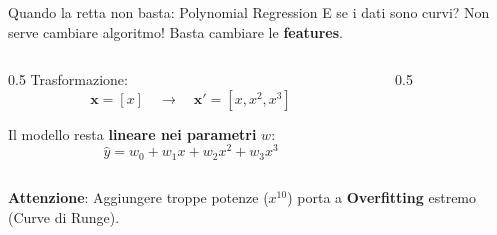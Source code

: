 \documentclass[aspectratio=169, 10pt]{beamer}
\begin{document}
\begin{frame}{Quando la retta non basta: Polynomial Regression}
    E se i dati sono curvi?
    Non serve cambiare algoritmo! Basta cambiare le \textbf{features}.
    
    \begin{columns}
        \begin{column}{0.5\textwidth}
            Trasformazione:
            \[ \mathbf{x} = [x] \quad \longrightarrow \quad \mathbf{x}' = [x, x^2, x^3] \]
            
            Il modello resta \textbf{lineare nei parametri} $w$:
            \[ \hat{y} = w_0 + w_1 x + w_2 x^2 + w_3 x^3 \]
        \end{column}
        \begin{column}{0.5\textwidth}
            \centering
        \end{column}
    \end{columns}
    
    \vspace{0.5em}
    \textbf{Attenzione}: Aggiungere troppe potenze ($x^{10}$) porta a \textbf{Overfitting} estremo (Curve di Runge).
\end{frame}
\end{document}
